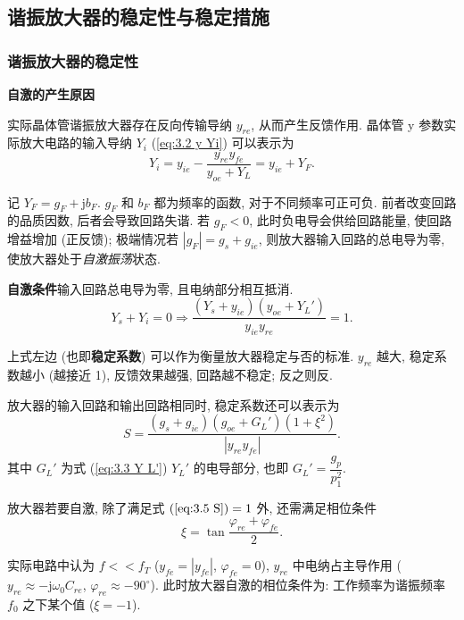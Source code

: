 \subsection{谐振放大器的稳定性与稳定措施} \label{3 谐振放大器的稳定性与稳定措施}
\subsubsection{谐振放大器的稳定性}
\textbf{自激的产生原因}

实际晶体管谐振放大器存在反向传输导纳 $y_{re}$, 从而产生反馈作用. 晶体管 y 参数实际放大电路的输入导纳 $Y_i$ (\ref{eq:3.2 y Yi}) 可以表示为
\begin{equation} \label{eq:3.5 Y i}
    Y_i=y_{ie}-\frac{y_{re}y_{fe}}{y_{oe}+Y_L}=y_{ie}+Y_F.
\end{equation}

记 $Y_F=g_F+\mathrm{j}b_F$. $g_F$ 和 $b_F$ 都为频率的函数, 对于不同频率可正可负. 前者改变回路的品质因数, 后者会导致回路失谐. 若 $g_F<0$, 此时负电导会供给回路能量, 使回路增益增加 (正反馈); 极端情况若 $|g_F|=g_s+g_{ie}$, 则放大器输入回路的总电导为零, 使放大器处于\textit{自激振荡}状态.

\textbf{自激条件}\quad 输入回路总电导为零, 且电纳部分相互抵消.
\begin{equation}
    Y_s+Y_i=0 \Rightarrow \frac{(Y_s+y_{ie})(y_{oe}+Y_L')}{y_{ie}y_{re}}=1.
\end{equation}

上式左边 (也即\textbf{稳定系数}) 可以作为衡量放大器稳定与否的标准. $y_{re}$ 越大, 稳定系数越小 (越接近 1), 反馈效果越强, 回路越不稳定; 反之则反.

放大器的输入回路和输出回路相同时, 稳定系数还可以表示为
\begin{equation} \label{eq:3.5 S}
    S=\frac{(g_s+g_{ie})(g_{oe}+G_L')(1+\xi^2)}{|y_{re}y_{fe}|}.
\end{equation}
其中 $G_L'$ 为式 (\ref{eq:3.3 Y L'}) $Y_L'$ 的电导部分, 也即 $G_L'=\dfrac{g_p}{p_1^2}$.

放大器若要自激, 除了满足式 $(\ref{eq:3.5 S})=1$ 外, 还需满足相位条件
\begin{equation}
    \xi=\tan\frac{\varphi_{re}+\varphi_{fe}}{2}.
\end{equation}

实际电路中认为 $f<<f_T$ ($y_{fe}=|y_{fe}|$, $\varphi_{fe}=0$), $y_{re}$ 中电纳占主导作用 ($y_{re}\approx-\mathrm{j}\omega_0C_{re}$, $\varphi_{re}\approx -90^\circ$). 此时放大器自激的相位条件为: 工作频率为谐振频率 $f_0$ 之下某个值 ($\xi=-1$).

